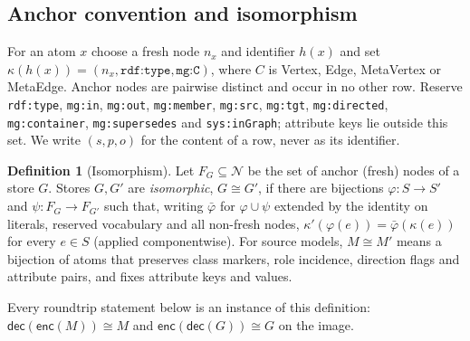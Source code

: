 \documentclass[11pt]{article}
\theoremstyle{plain}
\theoremstyle{definition}
\newtheorem{definition}{Definition}
\theoremstyle{remark}
\newcommand{\Node}{\mathcal N}
\newcommand{\enc}{\mathsf{enc}}
\newcommand{\dec}{\mathsf{dec}}
\newcommand{\mg}[1]{\texttt{mg:#1}}
\newcommand{\sys}[1]{\texttt{sys:#1}}
\newcommand{\iri}[1]{\texttt{#1}}
\begin{document}
\subsection{Anchor convention and isomorphism}
For an atom $x$ choose a fresh node $n_x$ and identifier $h(x)$ and set
$\kappa(h(x))=(n_x,\iri{rdf:type},\mg{C})$, where $C$ is Vertex, Edge, MetaVertex or
MetaEdge. Anchor nodes are pairwise distinct and occur in no other row. Reserve
\iri{rdf:type}, \mg{in}, \mg{out}, \mg{member}, \mg{src}, \mg{tgt}, \mg{directed},
\mg{container}, \mg{supersedes} and \sys{inGraph}; attribute keys lie outside this set.
We write $(s,p,o)$ for the content of a row, never as its identifier.

\begin{definition}[Isomorphism]\label{def:iso}
Let $F_G\subseteq\Node$ be the set of anchor (fresh) nodes of a store $G$. Stores $G,G'$
are \emph{isomorphic}, $G\cong G'$, if there are bijections $\varphi:S\to S'$ and
$\psi:F_G\to F_{G'}$ such that, writing $\bar\varphi$ for $\varphi\cup\psi$ extended by
the identity on literals, reserved vocabulary and all non-fresh nodes,
$\kappa'(\varphi(e))=\bar\varphi(\kappa(e))$ for every $e\in S$ (applied componentwise).
For source models, $M\cong M'$ means a bijection of atoms that preserves class markers,
role incidence, direction flags and attribute pairs, and fixes attribute keys and values.
\end{definition}
Every roundtrip statement below is an instance of this definition: $\dec(\enc(M))\cong M$
and $\enc(\dec(G))\cong G$ on the image.
\end{document}
